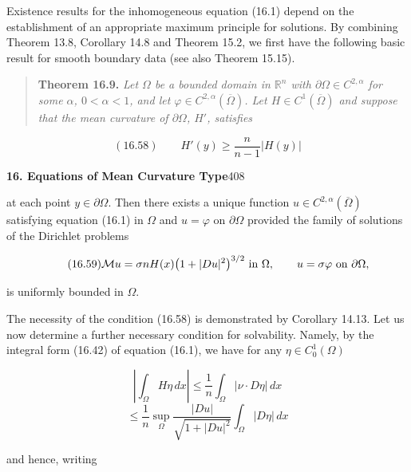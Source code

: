 Existence results for the inhomogeneous equation (16.1) depend on the establishment of an appropriate maximum principle for solutions. By combining Theorem 13.8, Corollary 14.8 and Theorem 15.2, we first have the following basic result for smooth boundary data (see also Theorem 15.15).

\begin{quote}
\textbf{Theorem 16.9.} \emph{Let $\Omega$ be a bounded domain in $\mathbb{R}^n$ with $\partial\Omega \in C^{2,\alpha}$ for some $\alpha$, $0<\alpha<1$, and let $\varphi \in C^{2,\alpha}(\overline{\Omega})$. Let $H \in C^1(\overline{\Omega})$ and suppose that the mean curvature of $\partial\Omega$, $H'$, satisfies}
\end{quote}

\begin{equation}
(16.58)\qquad H'(y) \geq \frac{n}{n-1} |H(y)|
\end{equation}


\pagestyle{empty}



\setcounter{page}{408}

\noindent\textbf{16. Equations of Mean Curvature Type}\hfill 408

\bigskip

at each point $y \in \partial\Omega$. Then there exists a unique function $u \in C^{2,\alpha}(\overline{\Omega})$ satisfying
equation (16.1) in $\Omega$ and $u=\varphi$ on $\partial\Omega$ provided the family of solutions of the Dirichlet
problems

\begin{equation*}\tag{16.59}
\mathcal{M} u = \sigma nH(x)\bigl(1+|Du|^2\bigr)^{3/2}\ \text{in }\Omega,\qquad u=\sigma\varphi\ \text{on }\partial\Omega,
\end{equation*}

is uniformly bounded in $\Omega$.

\medskip

The necessity of the condition (16.58) is demonstrated by Corollary 14.13. Let us
now determine a further necessary condition for solvability. Namely, by the integral
form (16.42) of equation (16.1), we have for any $\eta \in C_0^1(\Omega)$

\[
\left|\int_\Omega H\eta\,dx\right|\leq \frac{1}{n}\int_\Omega |\nu\cdot D\eta|\,dx
\]
\[
\leq \frac{1}{n}\sup_\Omega \frac{|Du|}{\sqrt{1+|Du|^2}}\int_\Omega |D\eta|\,dx
\]

\noindent and hence, writing

